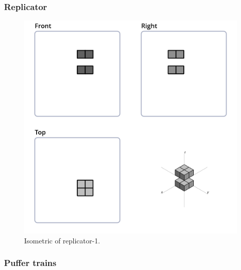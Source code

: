 \subsubsection{Replicator}
\begin{figure}[H]
	\centering
	\includegraphics[scale=0.532]{iso_settings/puffer_1.png}
	\caption{Isometric of replicator-1.}
  \label{fig:iso-puffer-1}
\end{figure}

\subsubsection{Puffer trains}

